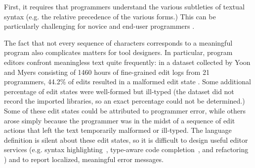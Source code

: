 

First, it requires that programmers understand the various subtleties of textual syntax (e.g. the relative precedence of the various forms.) This can be particularly challenging for novice and end-user programmers \cite{Altadmri:2015:MCI:2676723.2677258}. %

The fact that not every sequence of characters corresponds to a meaningful program also complicates matters for tool designers. In particular, program editors confront meaningless text quite frequently: in a dataset collected by Yoon and Myers consisting of 1460 hours of fine-grained edit logs from 21 programmers, 44.2\% of edits resulted in a malformed edit state \cite{6883030}. Some additional percentage of edit states were well-formed but ill-typed (the dataset did not record the imported libraries, so an exact percentage could not be determined.)  
Some of these edit states could be attributed to programmer error, while others arose simply because the programmer was in the midst of a sequence of edit actions that left the text temporarily malformed or ill-typed. The language definition is silent about these edit states, so it is difficult to design useful editor services (e.g. syntax highlighting~\cite{sarkar2015impact}, type-aware code completion~\cite{Mooty:2010:CCC:1915084.1916348,Omar:2012:ACC:2337223.2337324}, and refactoring ) and to report localized, meaningful error messages.

